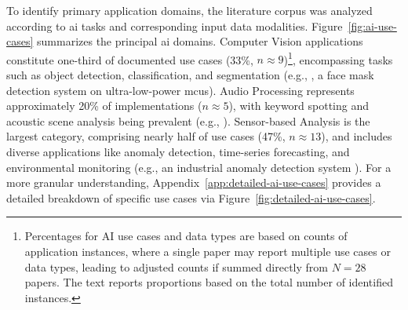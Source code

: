 To identify primary application domains, the literature corpus was analyzed according to \gls{ai} tasks and corresponding input data modalities. Figure~\ref{fig:ai-use-cases} summarizes the principal \gls{ai} domains. Computer Vision applications constitute one-third of documented use cases (33\%, $n \approx 9$)\footnote{Percentages for AI use cases and data types are based on counts of application instances, where a single paper may report multiple use cases or data types, leading to adjusted counts if summed directly from $N=28$ papers. The text reports proportions based on the total number of identified instances.}, encompassing tasks such as object detection, classification, and segmentation (e.g., \cite{azevedoDetectingFaceMasks2023a}, a face mask detection system on ultra-low-power \glspl{mcu}). Audio Processing represents approximately 20\% of implementations ($n \approx 5$), with keyword spotting and acoustic scene analysis being prevalent (e.g., \cite{grauOnDeviceTrainingMachine2021}). Sensor-based Analysis is the largest category, comprising nearly half of use cases (47\%, $n \approx 13$), and includes diverse applications like anomaly detection, time-series forecasting, and environmental monitoring (e.g., an industrial anomaly detection system \cite{antoniniTinyMLOpsFrameworkOrchestrating2022}). For a more granular understanding, Appendix~\ref{app:detailed-ai-use-cases} provides a detailed breakdown of specific use cases via Figure~\ref{fig:detailed-ai-use-cases}.

